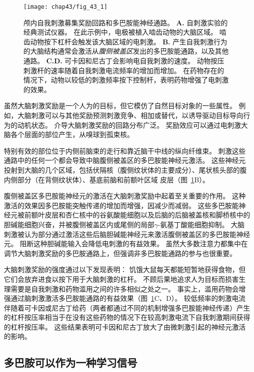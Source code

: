 \begin{figure}[htbp]
	\centering
	\texttt{[image: chap43/fig\_43\_1]}
	\caption{颅内自我刺激募集奖励回路和多巴胺能神经通路。
		\textbf{A.} 自刺激实验的经典测试仪器。
		在此示例中，电极被植入啮齿动物的大脑区域。
		啮齿动物按下杠杆会触发该大脑区域的电刺激。
		\textbf{B.} 产生自我刺激行为的大脑结构通常会激活从\textit{腹侧被盖区}发出的多巴胺能通路，以及其他通路。
		\textbf{C.D.} 可卡因和尼古丁会影响电自我刺激的速度。
		动物按压刺激杆的速率随着自我刺激电流频率的增加而增加。
		在药物存在的情况下，动物以较低的刺激频率按下控制杆，表明药物增强了电刺激的效果。}
	\label{fig:43_1}
\end{figure}


虽然大脑刺激奖励是一个人为的目标，但它模仿了自然目标对象的一些属性。
例如，大脑刺激可以与其他奖励预测刺激竞争、相加或替代，以诱导驱动目标导向行为的动机状态。
介导大脑刺激奖励的回路分布广泛。
奖励效应可以通过电刺激大脑各个层面的部位产生，从嗅球到孤束核。


特别有效的部位位于内侧前脑束的走行和靠近脑干中线的纵向纤维束。
刺激这些通路中的任何一个都会导致中脑腹侧被盖区的多巴胺能神经元激活。
这些神经元投射到大脑的几个区域，包括伏隔核（腹侧纹状体的主要成分）、尾状核头部的腹内侧部分（在背侧纹状体）、基底前脑和前额叶区域 皮层（图~\ref{fig:43_1}B）。


腹侧被盖区多巴胺能神经元的激活在大脑刺激奖励中起着至关重要的作用。
这种激活的效果因多巴胺能突触传递的增加而增强，因减少而减弱。
这些多巴胺能神经元被前额叶皮层和杏仁核中的谷氨酸能细胞以及后脑的后脑被盖核和脚桥核中的胆碱能细胞兴奋，并被腹侧被盖区内或尾侧的局部$\gamma$-氨基丁酸能细胞抑制。
大脑刺激被认为部分通过激活这些后脑胆碱能神经元来激活腹侧被盖区的多巴胺能神经元。
阻断这种胆碱能输入会降低电刺激的有益效果。
虽然大多数注意力都集中在调节大脑刺激奖励的多巴胺通路上，但强调非多巴胺能通路的参与也很重要。


大脑刺激奖励的强度通过以下发现表明：
饥饿大鼠每天都能短暂地获得食物，但它们会放弃进食以按下用于大脑刺激的杠杆。
不顾后果地追求人为目标而损害生理需要是自我刺激和药物滥用之间的许多相似之处之一。
事实上，滥用药物会增强通过脑刺激激活多巴胺能通路的有益效果（图~\ref{fig:43_1}C、D）。
较低频率的刺激电流伴随着可卡因或尼古丁给药（两者都通过不同的机制增强多巴胺能神经传递）产生的杠杆按压率相当于在没有这些药物的情况下在较高刺激电流下自我刺激期间获得的杠杆按压率。
这些结果表明可卡因和尼古丁放大了由微刺激引起的神经元激活的影响。



\subsection{多巴胺可以作为一种学习信号}

